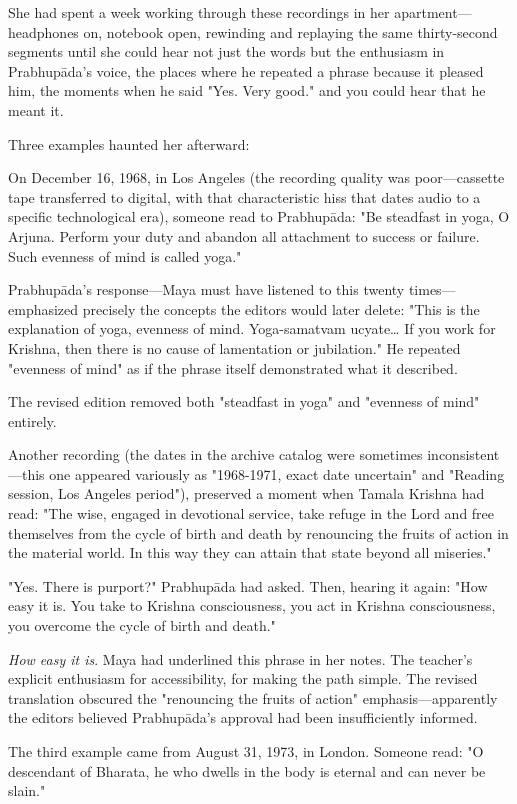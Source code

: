 \documentclass[12pt,twoside]{book}
\begin{document}
She had spent a week working through these recordings in her apartment—headphones on, notebook open, rewinding and replaying the same thirty-second segments until she could hear not just the words but the enthusiasm in Prabhupāda's voice, the places where he repeated a phrase because it pleased him, the moments when he said "Yes. Very good." and you could hear that he meant it.

Three examples haunted her afterward:

On December 16, 1968, in Los Angeles (the recording quality was poor—cassette tape transferred to digital, with that characteristic hiss that dates audio to a specific technological era), someone read to Prabhupāda: "Be steadfast in yoga, O Arjuna. Perform your duty and abandon all attachment to success or failure. Such evenness of mind is called yoga."

Prabhupāda's response—Maya must have listened to this twenty times—emphasized precisely the concepts the editors would later delete: "This is the explanation of yoga, evenness of mind. Yoga-samatvam ucyate\ldots{} If you work for Krishna, then there is no cause of lamentation or jubilation." He repeated "evenness of mind" as if the phrase itself demonstrated what it described.

The revised edition removed both "steadfast in yoga" and "evenness of mind" entirely.

Another recording (the dates in the archive catalog were sometimes inconsistent—this one appeared variously as "1968-1971, exact date uncertain" and "Reading session, Los Angeles period"), preserved a moment when Tamala Krishna had read: "The wise, engaged in devotional service, take refuge in the Lord and free themselves from the cycle of birth and death by renouncing the fruits of action in the material world. In this way they can attain that state beyond all miseries."

"Yes. There is purport?" Prabhupāda had asked. Then, hearing it again: "How easy it is. You take to Krishna consciousness, you act in Krishna consciousness, you overcome the cycle of birth and death."

\emph{How easy it is}. Maya had underlined this phrase in her notes. The teacher's explicit enthusiasm for accessibility, for making the path simple. The revised translation obscured the "renouncing the fruits of action" emphasis—apparently the editors believed Prabhupāda's approval had been insufficiently informed.

The third example came from August 31, 1973, in London. Someone read: "O descendant of Bharata, he who dwells in the body is eternal and can never be slain."
\end{document}
